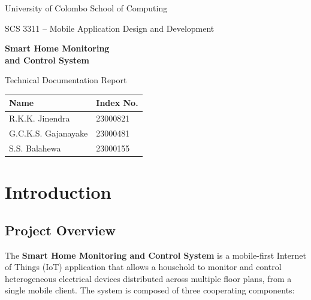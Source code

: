 \documentclass[11pt,a4paper]{article}
\begin{document}
\begin{titlepage}
    \centering
    \vspace*{1cm}
    {\large University of Colombo School of Computing\par}
    \vspace{0.3cm}
    {\large SCS 3311 -- Mobile Application Design and Development\par}
    \vspace{2cm}

    {\Huge\bfseries\color{primaryblue} Smart Home Monitoring \\ and Control System\par}
    \vspace{0.5cm}
    {\Large Technical Documentation Report\par}

    \vspace{2cm}
 \vspace{2cm}
    \begin{tabular}{ll}
        \toprule
        \textbf{Name} & \textbf{Index No.} \\
        \midrule
        R.K.K. Jinendra & 23000821 \\
        G.C.K.S. Gajanayake & 23000481 \\
        S.S. Balahewa & 23000155 \\
        \bottomrule
    \end{tabular}

\end{titlepage}

\tableofcontents
\newpage

\section{Introduction}

\subsection{Project Overview}
The \textbf{Smart Home Monitoring and Control System} is a mobile-first Internet of Things (IoT) application that allows a household to monitor and control heterogeneous electrical devices distributed across multiple floor plans, from a single mobile client. The system is composed of three cooperating components:
\end{document}
